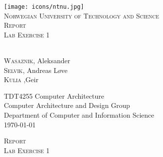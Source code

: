 \documentclass[11pt]{article}
\begin{document}
\begin{titlepage} 

\begin{center}


\texttt{[image: icons/ntnu.jpg]}\\[1cm]    

\textsc{Norwegian University of Technology and Science}\\[1.5cm]

\textsc{\Large Report \\Lab Exercise 1}\\[0.5cm]



\begin{minipage}{0.4\textwidth}
\begin{center}

 \large
\emph{}\\
\textsc{Wasaznik}, Aleksander \\
\textsc{Selvik}, Andreas L{\o}ve  \\
\textsc{Kulia} ,Geir 



\end{center} 

\end{minipage}


 
\begin{minipage}{0.4\textwidth}

\end{minipage}

\vfill
TDT4255 Computer Architecture \\
Computer Architecture and Design Group \\
Department of Computer and Information Science \\
{\large \today}

\end{center}
\end{titlepage}

    \newpage

\begin{titlepage}
	\large
	\begin{center}

\textsc{\Large Report \\Lab Exercise 1}\\[0.5cm]

	\end{center}

\end{titlepage}
\end{document}
